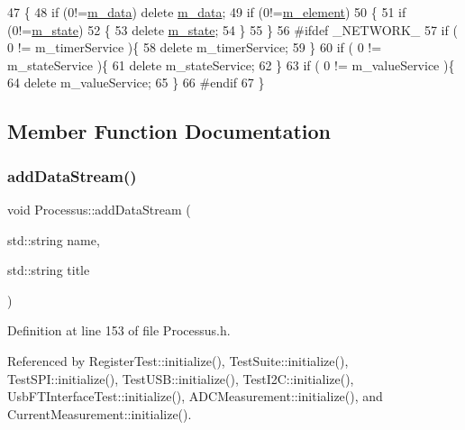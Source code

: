 \begin{DoxyCode}
47                       \{
48   \textcolor{keywordflow}{if} (0!=\hyperlink{classProcessus_a3da9a9de8af54e2f47807a3e09dfccff}{m\_data}) \textcolor{keyword}{delete} \hyperlink{classProcessus_a3da9a9de8af54e2f47807a3e09dfccff}{m\_data};
49   \textcolor{keywordflow}{if} (0!=\hyperlink{classProcessus_aa9d24d53c3e52f36786cabb5d8e296e7}{m\_element})
50   \{
51     \textcolor{keywordflow}{if} (0!=\hyperlink{classProcessus_ab3539eee42891ceae0baf4395ae7fb61}{m\_state})
52     \{
53       \textcolor{keyword}{delete} \hyperlink{classProcessus_ab3539eee42891ceae0baf4395ae7fb61}{m\_state};      
54     \}
55   \}
56 \textcolor{preprocessor}{#ifdef \_NETWORK\_}
57   \textcolor{keywordflow}{if} ( 0 != m\_timerService )\{
58     \textcolor{keyword}{delete} m\_timerService;
59   \}
60   \textcolor{keywordflow}{if} ( 0 != m\_stateService )\{
61     \textcolor{keyword}{delete} m\_stateService;
62   \}
63   \textcolor{keywordflow}{if} ( 0 != m\_valueService )\{
64     \textcolor{keyword}{delete} m\_valueService;
65   \}
66 \textcolor{preprocessor}{#endif}
67 \}
\end{DoxyCode}


\subsection{Member Function Documentation}
\mbox{\label{classProcessus_a308c8f193802f1d1ab49d4447d0cb281}} 
\subsubsection{\texorpdfstring{add\+Data\+Stream()}{addDataStream()}}
{\footnotesize\ttfamily void Processus\+::add\+Data\+Stream (\begin{DoxyParamCaption}\item[{std\+::string}]{name,  }\item[{std\+::string}]{title }\end{DoxyParamCaption})\hspace{0.3cm}{\ttfamily [inline]}}



Definition at line 153 of file Processus.\+h.



Referenced by Register\+Test\+::initialize(), Test\+Suite\+::initialize(), Test\+S\+P\+I\+::initialize(), Test\+U\+S\+B\+::initialize(), Test\+I2\+C\+::initialize(), Usb\+F\+T\+Interface\+Test\+::initialize(), A\+D\+C\+Measurement\+::initialize(), and Current\+Measurement\+::initialize().


